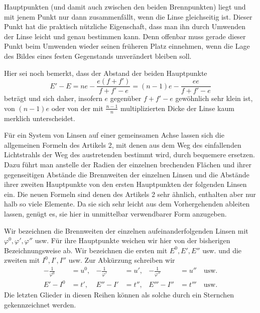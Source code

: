 Hauptpunkten (und damit auch zwischen den beiden Brennpunkten) liegt und mit jenem Punkt nur dann zusammenfällt, wenn die Linse gleichseitig ist. Dieser Punkt hat die praktisch nützliche Eigenschaft, dass man ihn durch Umwenden der Linse leicht und genau bestimmen kann. Denn offenbar muss gerade dieser Punkt beim Umwenden wieder seinen früheren Platz einnehmen, wenn die Lage des Bildes eines festen Gegenstands unverändert bleiben soll.

Hier sei noch bemerkt, dass der Abstand der beiden Hauptpunkte
\[
E'-E=ne-\frac{e(f+f')}{f+f'-e}=(n-1)e-\frac{ee}{f+f'-e}
\]
beträgt und sich daher, insofern $e$ gegenüber $f+f'-e$ gewöhnlich sehr klein ist, von $(n-1)e$ oder von der mit $\frac{n-1}{n}$ multiplizierten Dicke der Linse kaum merklich unterscheidet.

Für ein System von Linsen auf einer gemeinsamen Achse lassen sich die allgemeinen Formeln des Artikels 2, mit denen aus dem Weg des einfallenden Lichtstrahls der Weg des austretenden bestimmt wird, durch bequemere ersetzen. Dazu führt man anstelle der Radien der einzelnen brechenden Flächen und ihrer gegenseitigen Abstände die Brennweiten der einzelnen Linsen und die Abstände ihrer zweiten Hauptpunkte von den ersten Hauptpunkten der folgenden Linsen ein. Die neuen Formeln sind denen des Artikels 2 sehr ähnlich, enthalten aber nur halb so viele Elemente. Da sie sich sehr leicht aus dem Vorhergehenden ableiten lassen, genügt es, sie hier in unmittelbar verwendbarer Form anzugeben.

Wir bezeichnen die Brennweiten der einzelnen aufeinanderfolgenden Linsen mit $\varphi^0,\varphi',\varphi''$ usw. Für ihre Hauptpunkte weichen wir hier von der bisherigen Bezeichnungsweise ab. Wir bezeichnen die ersten mit $E^0,E',E''$ usw. und die zweiten mit $I^0,I',I''$ usw. Zur Abkürzung schreiben wir
\[
\begin{aligned}
-\frac1{\varphi^0}&=u^0,&-\frac1{\varphi'}&=u',&-\frac1{\varphi''}&=u''\quad\text{usw.}\\
E'-I^0&=t',&E''-I'&=t'',&E'''-I''&=t'''\quad\text{usw.}
\end{aligned}
\]
Die letzten Glieder in diesen Reihen können als solche durch ein Sternchen gekennzeichnet werden.

